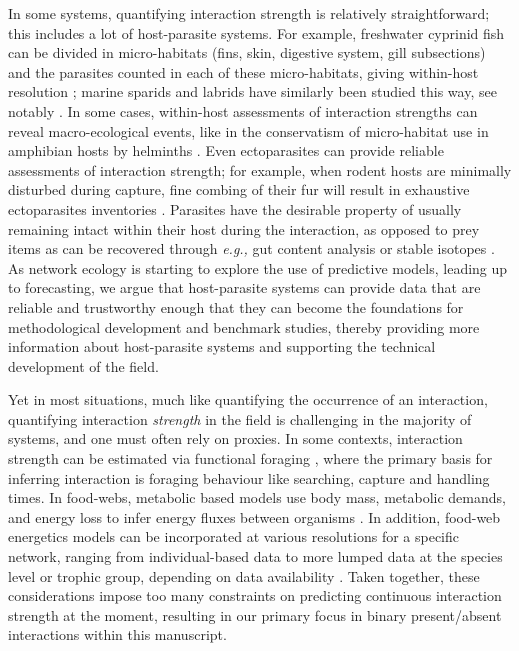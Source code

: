 In some systems, quantifying interaction strength is relatively
straightforward; this includes a lot of host-parasite systems. For
example, freshwater cyprinid fish can be divided in micro-habitats
(fins, skin, digestive system, gill subsections) and the parasites
counted in each of these micro-habitats, giving within-host resolution
\cite{Simkova2002AbuRel}; marine sparids and labrids have similarly been
studied this way, see notably \cite{Sasal1999ComStr,
Desdevises2006DetPar, Morand2002InvPat}. In some cases, within-host
assessments of interaction strengths can reveal macro-ecological events,
like in the conservatism of micro-habitat use in amphibian hosts by
helminths \cite{Badets2011CorEar}. Even ectoparasites can provide
reliable assessments of interaction strength; for example, when rodent
hosts are minimally disturbed during capture, fine combing of their fur
will result in exhaustive ectoparasites inventories
\cite{Hadfield2014TalTwo, Karbowiak2019ComImm, Matthee2020DivDis,
Sanchez2014PosCoo, Dickinson2020SamSca}. Parasites have the
desirable property of usually remaining intact within their host during
the interaction, as opposed to prey items as can be recovered through
\emph{e.g.,} gut content analysis or stable isotopes
\cite{Macias-Hernandez2018MolGut, Schmid-Araya2016TroPos}. As network
ecology is starting to explore the use of predictive models, leading up
to forecasting, we argue that host-parasite systems can provide data
that are reliable and trustworthy enough that they can become the
foundations for methodological development and benchmark studies,
thereby providing more information about host-parasite systems and
supporting the technical development of the field.

Yet in most situations, much like quantifying the occurrence of an
interaction, quantifying interaction \emph{strength} in the field is
challenging in the majority of systems, and one must often rely on
proxies. In some contexts, interaction strength can be estimated via
functional foraging \cite{Portalier2019MecPre}, where the primary basis
for inferring interaction is foraging behaviour like searching, capture
and handling times. In food-webs, metabolic based models use body mass,
metabolic demands, and energy loss to infer energy fluxes between
organisms \cite{Yodzis1992BodSiz, Berlow2009SimPre}. In addition,
food-web energetics models can be incorporated at various resolutions
for a specific network, ranging from individual-based data to more
lumped data at the species level or trophic group, depending on data
availability \cite{Barnes2018EneFlu, Berlow2009SimPre}. Taken together,
these considerations impose too many constraints on predicting
continuous interaction strength at the moment, resulting in our primary
focus in binary present/absent interactions within this manuscript.

